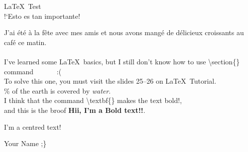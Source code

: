 \documentclass{article}
\begin{document}
\begin{center}
\LaTeX\ Test \\[5mm]
!`Esto es tan importante! \\[10mm]
\end{center}

J'ai \'et\'e \`a la f\^ete avec mes amis et nous avons mang\'e de d\'elicieux croissants au caf\'e ce matin. \\[5mm]
\lipsum[1] \\[10mm]
I've learned some \LaTeX\ basics, but I still don't know how to use \textbackslash section\{\} command \ \ \ \ \ \ :( \\[10mm]
To solve this one, you must visit the slides 25--26 on \LaTeX\ Tutorial. \\[5mm]

\% of the earth is covered by \emph{water}. \\
I think that the command \textbackslash textbf\{\} makes the text bold!, \\ and this is the broof \textbf{Hii, I'm a Bold text!!}. \\[10mm]

\begin{center}
  I'm a centred text! \\[10mm]
\end{center}

\begin{flushright}
Your Name ;\}
\end{flushright}
\end{document}
